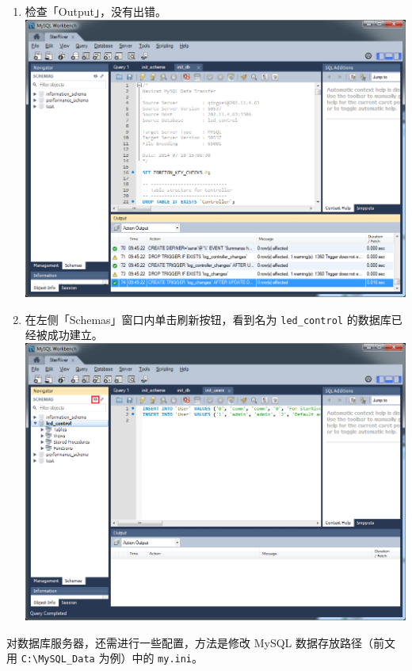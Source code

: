 \begin{enumerate}
\item
  检查「Output」，没有出错。 \includegraphics{img/db_init_10.png}
\item
  在左侧「Schemas」窗口内单击刷新按钮，看到名为 \texttt{led\_control}
  的数据库已经被成功建立。 \includegraphics{img/db_init_12.png}
\end{enumerate}

对数据库服务器，还需进行一些配置，方法是修改 MySQL 数据存放路径（前文用
\texttt{C:\textbackslash{}MySQL\_Data} 为例）中的 \texttt{my.ini}。

